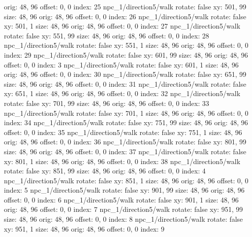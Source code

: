   orig: 48, 96
  offset: 0, 0
  index: 25
npc_1/direction5/walk
  rotate: false
  xy: 501, 99
  size: 48, 96
  orig: 48, 96
  offset: 0, 0
  index: 26
npc_1/direction5/walk
  rotate: false
  xy: 501, 1
  size: 48, 96
  orig: 48, 96
  offset: 0, 0
  index: 27
npc_1/direction5/walk
  rotate: false
  xy: 551, 99
  size: 48, 96
  orig: 48, 96
  offset: 0, 0
  index: 28
npc_1/direction5/walk
  rotate: false
  xy: 551, 1
  size: 48, 96
  orig: 48, 96
  offset: 0, 0
  index: 29
npc_1/direction5/walk
  rotate: false
  xy: 601, 99
  size: 48, 96
  orig: 48, 96
  offset: 0, 0
  index: 3
npc_1/direction5/walk
  rotate: false
  xy: 601, 1
  size: 48, 96
  orig: 48, 96
  offset: 0, 0
  index: 30
npc_1/direction5/walk
  rotate: false
  xy: 651, 99
  size: 48, 96
  orig: 48, 96
  offset: 0, 0
  index: 31
npc_1/direction5/walk
  rotate: false
  xy: 651, 1
  size: 48, 96
  orig: 48, 96
  offset: 0, 0
  index: 32
npc_1/direction5/walk
  rotate: false
  xy: 701, 99
  size: 48, 96
  orig: 48, 96
  offset: 0, 0
  index: 33
npc_1/direction5/walk
  rotate: false
  xy: 701, 1
  size: 48, 96
  orig: 48, 96
  offset: 0, 0
  index: 34
npc_1/direction5/walk
  rotate: false
  xy: 751, 99
  size: 48, 96
  orig: 48, 96
  offset: 0, 0
  index: 35
npc_1/direction5/walk
  rotate: false
  xy: 751, 1
  size: 48, 96
  orig: 48, 96
  offset: 0, 0
  index: 36
npc_1/direction5/walk
  rotate: false
  xy: 801, 99
  size: 48, 96
  orig: 48, 96
  offset: 0, 0
  index: 37
npc_1/direction5/walk
  rotate: false
  xy: 801, 1
  size: 48, 96
  orig: 48, 96
  offset: 0, 0
  index: 38
npc_1/direction5/walk
  rotate: false
  xy: 851, 99
  size: 48, 96
  orig: 48, 96
  offset: 0, 0
  index: 4
npc_1/direction5/walk
  rotate: false
  xy: 851, 1
  size: 48, 96
  orig: 48, 96
  offset: 0, 0
  index: 5
npc_1/direction5/walk
  rotate: false
  xy: 901, 99
  size: 48, 96
  orig: 48, 96
  offset: 0, 0
  index: 6
npc_1/direction5/walk
  rotate: false
  xy: 901, 1
  size: 48, 96
  orig: 48, 96
  offset: 0, 0
  index: 7
npc_1/direction5/walk
  rotate: false
  xy: 951, 99
  size: 48, 96
  orig: 48, 96
  offset: 0, 0
  index: 8
npc_1/direction5/walk
  rotate: false
  xy: 951, 1
  size: 48, 96
  orig: 48, 96
  offset: 0, 0
  index: 9

